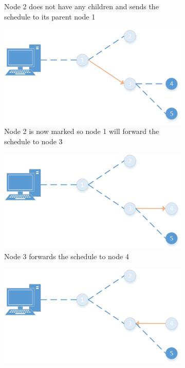 \begin{figure}[htbp]
\begin{subfigure}[t]{0.4\textwidth}
        \caption{Node 2 does not have any children and sends the schedule to its parent node 1}
        \label{fig:link}
    \end{subfigure}
    \quad
    \quad
    \begin{subfigure}[t]{0.4\textwidth}
		\centering         
        \includegraphics[scale=0.6]{content/images/ScheduleSpreading/Part4}
        \caption{Node 2 is now marked so node 1 will forward the schedule to node 3}
        \label{fig:link}
    \end{subfigure}
    \quad
    \quad
    \begin{subfigure}[t]{0.4\textwidth}
		\centering         
        \includegraphics[scale=0.6]{content/images/ScheduleSpreading/Part5}
        \caption{Node 3 forwards the schedule to node 4}
        \label{fig:link}
    \end{subfigure}
    \quad
    \quad
    \begin{subfigure}[t]{0.4\textwidth}
		\centering         
        \includegraphics[scale=0.6]{content/images/ScheduleSpreading/Part6}

\end{subfigure}
\end{figure}
